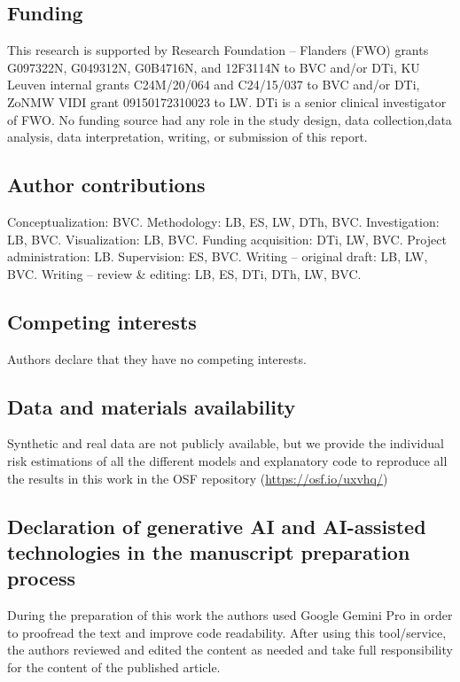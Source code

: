 \subsection*{Funding} This research is supported by Research Foundation -- Flanders (FWO) grants G097322N, G049312N, G0B4716N, and 12F3114N to BVC and/or DTi, KU Leuven internal grants C24M/20/064 and C24/15/037 to BVC and/or DTi, ZoNMW VIDI grant 09150172310023 to LW. DTi is a senior clinical investigator of FWO. No funding source had any role in the study design, data collection,data analysis, data interpretation, writing, or submission of this report.

\subsection*{Author contributions} Conceptualization: BVC. Methodology: LB, ES, LW, DTh, BVC. Investigation: LB, BVC. Visualization: LB, BVC. Funding acquisition: DTi, LW, BVC. Project administration: LB. Supervision: ES, BVC. Writing -- original draft: LB, LW, BVC. Writing -- review \& editing: LB, ES, DTi, DTh, LW, BVC.

\subsection*{Competing interests} Authors declare that they have no competing interests.

\subsection*{Data and materials availability} Synthetic and real data are not publicly available, but we provide the individual risk estimations of all the different models and explanatory code to reproduce all the results in this work in the OSF repository (\url{https://osf.io/uxvhq/})

\subsection*{Declaration of generative AI and AI-assisted technologies in the manuscript preparation process}
During the preparation of this work the authors used Google Gemini Pro in order to proofread the text and improve code readability. After using this tool/service, the authors reviewed and edited the content as needed and take full responsibility for the content of the published article.	
 
